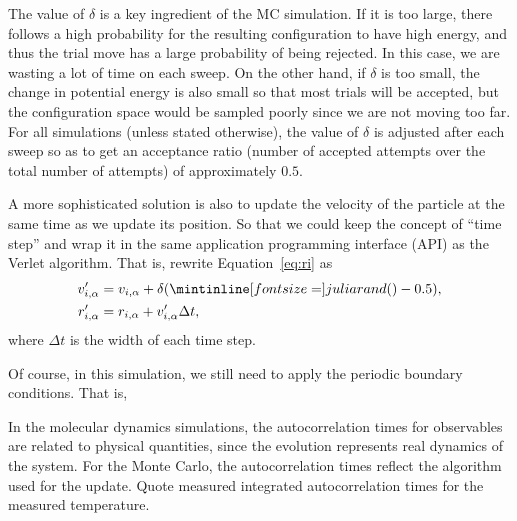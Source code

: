 The value of \(\delta\) is a key
ingredient of the MC simulation. If it is too large, there follows a high probability
for the resulting configuration to have high energy, and thus the trial move has a
large probability of being rejected.
In this case, we are wasting a lot of time on each sweep.
On the other hand, if \(\delta\) is too small, the change in
potential energy is also small so that most trials will be accepted, but the configuration
space would be sampled poorly since we are not moving too far.
For all simulations (unless stated otherwise), the
value of \(\delta\) is adjusted after each sweep so as to get an acceptance ratio (number of
accepted attempts over the total number of attempts) of approximately \(0.5\).

A more sophisticated solution is also to update the velocity of the particle
at the same time as we update its position. So that we could keep the concept of
``time step'' and wrap it in the same application programming interface (API)
as the Verlet algorithm.
That is, rewrite Equation~\eqref{eq:ri} as
%
\begin{align}
    v_{i, \alpha}' & = v_{i, \alpha} + \delta (\code{rand()} - 0.5), \\
    r_{i, \alpha}' & = r_{i, \alpha} + v_{i, \alpha}' \Delta t,
\end{align}
%
where \(\Delta t\) is the width of each time step.

Of course, in this simulation, we still need to apply the periodic boundary conditions.
That is,

\Question{}
In the molecular dynamics simulations, the autocorrelation times for observables are related
to physical quantities, since the evolution represents real dynamics of the system. For the
Monte Carlo, the autocorrelation times reflect the algorithm used for the update. Quote
measured integrated autocorrelation times for the measured temperature.

\Answer{}
